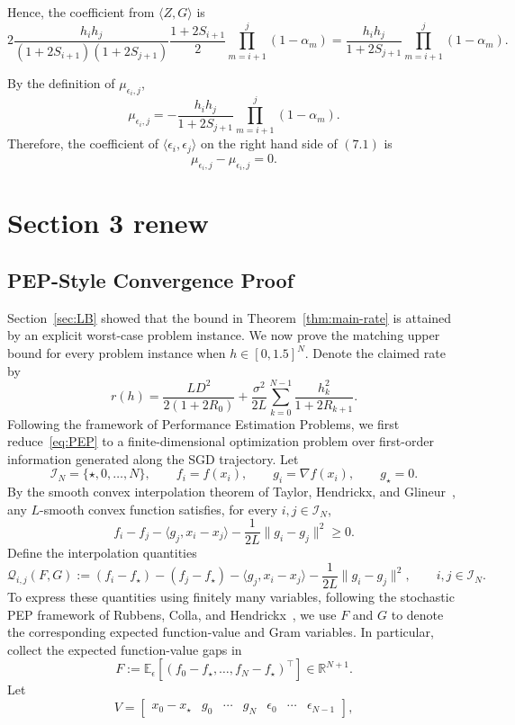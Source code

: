 {Hence, the coefficient from $\langle Z,G\rangle$ is
\[2\frac{h_ih_j}{(1+2S_{i+1})(1+2S_{j+1})}\frac{1+2S_{i+1}}{2}\prod_{m=i+1}^{j}(1-\alpha_m)
=\frac{h_ih_j}{1+2S_{j+1}}\prod_{m=i+1}^{j}(1-\alpha_m).\]

By the definition of $\mu_{\epsilon_i,j}$,
\[\mu_{\epsilon_i,j}=-\frac{h_ih_j}{1+2S_{j+1}}\prod_{m=i+1}^{j}(1-\alpha_m).\]
Therefore, the coefficient of $\langle \epsilon_i,\epsilon_j\rangle$ on the right hand side of $(7.1)$ is\[\mu_{\epsilon_i,j}-\mu_{\epsilon_i,j}=0.\]
}

\section{Section 3 renew}
\subsection{PEP-Style Convergence Proof}
Section~\ref{sec:LB} showed that the bound in Theorem~\ref{thm:main-rate} is attained by an explicit worst-case problem instance. We now prove the matching upper bound for every problem instance when $h\in[0,1.5]^N$. Denote the claimed rate by
\[r(h)=\frac{LD^2}{2(1+2R_0)}+\frac{\sigma^2}{2L} \sum_{k=0}^{N-1}
\frac{h_k^2}{1+2R_{k+1}}.\]
Following the framework of Performance Estimation Problems, we first
reduce~\eqref{eq:PEP} to a finite-dimensional optimization problem over
first-order information generated along the SGD trajectory. Let
\[ \mathcal I_N=\{\star,0,\ldots,N\}, \qquad f_i=f(x_i), \qquad g_i=\nabla f(x_i), \qquad g_\star=0. \]
By the smooth convex interpolation theorem of
Taylor, Hendrickx, and Glineur~\cite{taylor2017smooth}, any
$L$-smooth convex function satisfies, for every $i,j\in\mathcal I_N$,
\[ f_i-f_j -\langle g_j,x_i-x_j\rangle -\frac{1}{2L}\|g_i-g_j\|^2 \geq 0. \]
Define the interpolation quantities
\[\mathcal Q_{i,j}(F,G):=(f_i-f_\star)-(f_j-f_\star)-\langle g_j,x_i-x_j\rangle-\frac{1}{2L}\|g_i-g_j\|^2,\qquad i,j\in\mathcal I_N.\]
To express these quantities using finitely many variables, following the
stochastic PEP framework of Rubbens, Colla, and
Hendrickx~\cite{rubbens2025}, we use $F$ and $G$ to denote the
corresponding expected function-value and Gram variables. In particular,
collect the expected function-value gaps in
\[
F:=\mathbb E_\epsilon
\left[(f_0-f_\star,\ldots,f_N-f_\star)^\top\right]
\in\mathbb R^{N+1}.
\]
Let
\[
V=
\begin{bmatrix}
x_0-x_\star
&
g_0
&
\cdots
&
g_N
&
\epsilon_0
&
\cdots
&
\epsilon_{N-1}
\end{bmatrix},
\]
